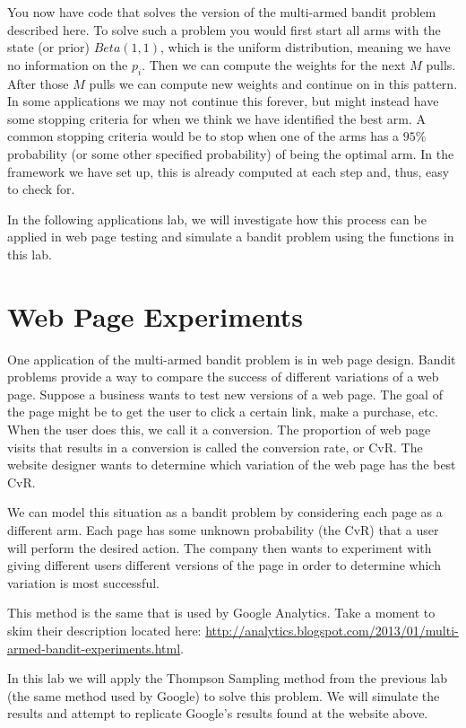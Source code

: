 You now have code that solves the version of the multi-armed bandit problem described here. 
To solve such a problem you would first start all arms with the state (or prior) $Beta(1,1)$,
which is the uniform distribution, meaning we have no information on the $p_i$.
Then we can compute the weights for the next $M$ pulls. 
After those $M$ pulls we can compute new weights and continue on in this pattern. 
In some applications we may not continue this forever, but might instead have some stopping
criteria for when we think we have identified the best arm. 
A common stopping criteria would be to stop when one of the arms has a $95\%$ probability
(or some other specified probability) of being the optimal arm. 
In the framework we have set up, this is already computed at each step and, thus, easy to check for.

In the following applications lab, we will investigate how this process can be applied 
in web page testing and simulate a bandit problem using the functions in this lab. 

\section*{Web Page Experiments}
One application of the multi-armed bandit problem is in web page design.
Bandit problems provide a way to compare the success of different variations of a web page.
Suppose a business wants to test new versions of a web page.
The goal of the page might be to get the user to click a certain link, make a purchase, etc.
When the user does this, we call it a conversion.  The proportion of web page visits
that results in a conversion is called the conversion rate, or CvR.
The website designer wants to determine which variation of the web page has the best CvR.

We can model this situation as a bandit problem by considering each page as a different arm.
Each page has some unknown probability (the CvR) that a user will perform the desired action.
The company then wants to experiment with giving different users different versions of
the page in order to determine which variation is most successful.

This method is the same that is used by Google Analytics.  Take a moment to skim their description located here:
\url{http://analytics.blogspot.com/2013/01/multi-armed-bandit-experiments.html}.

In this lab we will apply the Thompson Sampling method from the previous lab (the same method used by Google)
to solve this problem.  We will simulate the results and attempt to replicate Google's results found at the website above.

